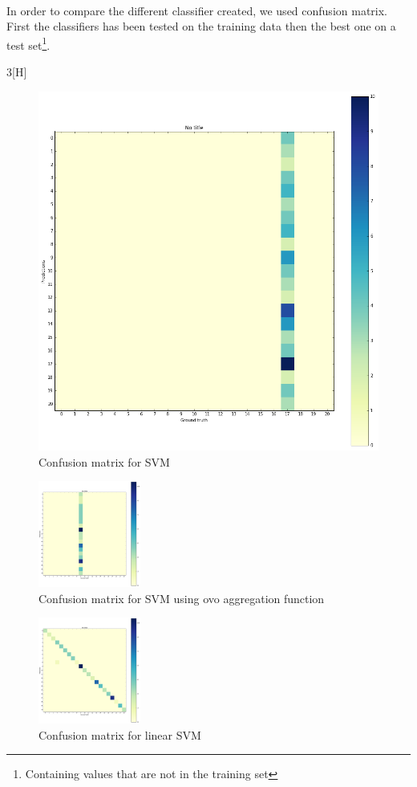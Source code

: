 \paragraph{}
In order to compare the different classifier created, we used confusion matrix. First the classifiers has been tested on the training data then the best one on a test set\footnote{Containing values that are not in the training set}. 

\begin{multicols}{3}[H]
	\begin{figure}[H]
		\centering
		\includegraphics[height=0.3\textwidth]{classifier_svm}
		\caption{Confusion matrix for SVM}
		\label{svm}
	\end{figure}

	\begin{figure}[H]
		\centering
		\includegraphics[width=0.3\textwidth]{classifier_svm_ovo}
		\caption{Confusion matrix for SVM using ovo aggregation function}
		\label{svm_ovo}
	\end{figure}
	
	\begin{figure}[H]
		\centering
		\includegraphics[width=0.3\textwidth]{classifier_svm_linear}
		\caption{Confusion matrix for linear SVM}
		\label{svm_linear}
	\end{figure}
\end{multicols}

